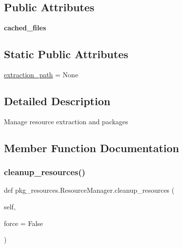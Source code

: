 \subsection*{Public Attributes}
\begin{DoxyCompactItemize}
\item 
\mbox{\label{classpkg__resources_1_1_resource_manager_a73e8a505d671a5662efa4f9213a32c32}} 
{\bfseries cached\+\_\+files}
\end{DoxyCompactItemize}
\subsection*{Static Public Attributes}
\begin{DoxyCompactItemize}
\item 
\hyperlink{classpkg__resources_1_1_resource_manager_a6120904625d6624b7ecae0f9175ea9dd}{extraction\+\_\+path} = None
\end{DoxyCompactItemize}


\subsection{Detailed Description}
\begin{DoxyVerb}Manage resource extraction and packages\end{DoxyVerb}
 

\subsection{Member Function Documentation}
\mbox{\label{classpkg__resources_1_1_resource_manager_a85ba051ec7d82f0803dd96e45df1d21d}} 
\subsubsection{\texorpdfstring{cleanup\+\_\+resources()}{cleanup\_resources()}}
{\footnotesize\ttfamily def pkg\+\_\+resources.\+Resource\+Manager.\+cleanup\+\_\+resources (\begin{DoxyParamCaption}\item[{}]{self,  }\item[{}]{force = {\ttfamily False} }\end{DoxyParamCaption})}

